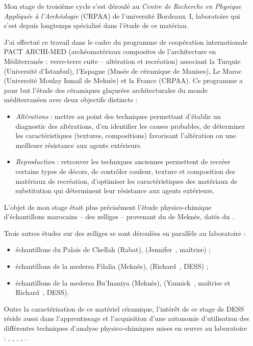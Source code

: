 Mon stage de troisième cycle s'est déroulé au \emph{Centre de 
Recherche en Physique Appliquée à l'Archéologie} (CRPAA) de 
l'université Bordeaux~I, laboratoire qui s'est depuis longtemps 
spécialisé dans l'étude de ce matériau.

J'ai effectué ce travail dans le cadre du programme de coopération 
internationale PACT ARCHI-MED (archéomatériaux composites de 
l'architecture en Méditerranée : verre-terre cuite -- altération et 
recréation) associant la Turquie (Université d'Istanbul), l'Espagne 
(Musée de céramique de Manises), Le Maroc (Université Moulay Ismail 
de Meknès) et la France (CRPAA). Ce programme a pour but l'étude des 
céramiques glaçurées architecturales du monde méditerranéen avec deux 
objectifs distincts :

\begin{itemize}
  \item \emph{Altérations} : mettre au point des techniques 
        permettant d'établir un diagnostic des altérations, 
        d'en identifier les causes probables, de déterminer les 
        caractéristiques (textures, compositions) favorisant 
        l'altération ou une meilleure résistance aux agents extérieurs.
  \item \emph{Reproduction} : retrouver les techniques anciennes 
        permettent de recréer certains types de décors, de contrôler 
        couleur, texture et composition des matériaux de recréation, 
        d'optimiser les caractéristiques des matériaux de substitution 
        qui déterminent leur résistance aux agents extérieurs.
\end{itemize}

L'objet de mon stage était plus précisément l'étude physico-chimique 
d'échantillons marocains -- des zelliges -- provenant du \PaM de 
Meknès, datés du .

Trois autres études sur des zelliges se sont déroulées en parallèle au 
laboratoire :

\begin{itemize}
  \item échantillons du Palais de Chellah (Rabat), 
         (Jennifer~, maîtrise) ;
  \item échantillons de la medersa Filalia (Meknès), 
         (Richard~, DESS) ;
  \item échantillons de la medersa Bu'Inaniya (Meknès), 
         (Yannick~, maîtrise et 
        Richard~, DESS).
\end{itemize}

Outre la caractérisation de ce matériel céramique, l'intérêt de ce 
stage de DESS réside aussi dans l'apprentissage et l'acquisition 
d'une autonomie d'utilisation des différentes techniques d'analyse 
physico-chimiques mises en {\oe}uvre au laboratoire : \MEB[ie], 
\EDS, \CL, \SAO, \DX.